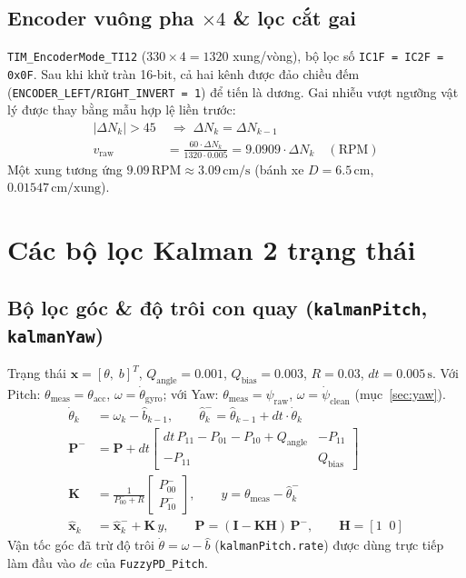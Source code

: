 \documentclass[10pt,a4paper]{article}
\begin{document}
\subsection{Encoder vuông pha $\times 4$ \& lọc cắt gai}
\texttt{TIM\_EncoderMode\_TI12} ($330 \times 4 = 1320$ xung/vòng), bộ lọc số \texttt{IC1F = IC2F = 0x0F}. Sau khi khử tràn 16-bit, cả hai kênh được đảo chiều đếm (\texttt{ENCODER\_LEFT/RIGHT\_INVERT = 1}) để tiến là dương. Gai nhiễu vượt ngưỡng vật lý được thay bằng mẫu hợp lệ liền trước:
\begin{align}
|\Delta N_k| > 45 &\;\Rightarrow\; \Delta N_k = \Delta N_{k-1} \\
v_{\text{raw}} &= \frac{60 \cdot \Delta N_k}{1320 \cdot 0.005} = 9.0909 \cdot \Delta N_k \quad (\text{RPM})
\end{align}
Một xung tương ứng $9.09\,\text{RPM} \approx 3.09\,\text{cm/s}$ (bánh xe $D = 6.5\,\text{cm}$, $0.01547\,\text{cm/xung}$).

\section{Các bộ lọc Kalman 2 trạng thái}
\subsection{Bộ lọc góc \& độ trôi con quay (\texttt{kalmanPitch}, \texttt{kalmanYaw})}
Trạng thái $\mathbf{x} = [\theta,\; b]^T$, $Q_{\text{angle}} = 0.001$, $Q_{\text{bias}} = 0.003$, $R = 0.03$, $dt = 0.005\,\text{s}$. Với Pitch: $\theta_{\text{meas}} = \theta_{\text{acc}}$, $\omega = \dot{\theta}_{\text{gyro}}$; với Yaw: $\theta_{\text{meas}} = \psi_{\text{raw}}$, $\omega = \dot{\psi}_{\text{clean}}$ (mục~\ref{sec:yaw}).
\begin{align}
\dot{\theta}_k &= \omega_k - \hat{b}_{k-1}, \qquad \hat{\theta}_k^- = \hat{\theta}_{k-1} + dt \cdot \dot{\theta}_k \\
\mathbf{P}^- &= \mathbf{P} + dt \begin{bmatrix} dt\,P_{11} - P_{01} - P_{10} + Q_{\text{angle}} & -P_{11} \\ -P_{11} & Q_{\text{bias}} \end{bmatrix} \\
\mathbf{K} &= \frac{1}{P^-_{00} + R}\begin{bmatrix} P^-_{00} \\ P^-_{10} \end{bmatrix}, \qquad y = \theta_{\text{meas}} - \hat{\theta}_k^- \\
\hat{\mathbf{x}}_k &= \hat{\mathbf{x}}_k^- + \mathbf{K}\, y, \qquad \mathbf{P} = (\mathbf{I} - \mathbf{K}\mathbf{H})\,\mathbf{P}^-, \qquad \mathbf{H} = [1 \;\; 0]
\end{align}
Vận tốc góc đã trừ độ trôi $\dot{\theta} = \omega - \hat{b}$ (\texttt{kalmanPitch.rate}) được dùng trực tiếp làm đầu vào $de$ của \texttt{FuzzyPD\_Pitch}.
\end{document}
